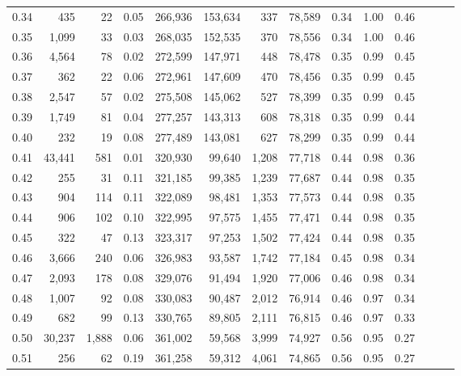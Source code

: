 \begin{tabular}{rrrrrrrrrrrrrr}
0.34 &     435 &      22 &  0.05 &  266,936 &  153,634 &     337 &  78,589 &  0.34 &  1.00 &      0.46 \\
0.35 &   1,099 &      33 &  0.03 &  268,035 &  152,535 &     370 &  78,556 &  0.34 &  1.00 &      0.46 \\
0.36 &   4,564 &      78 &  0.02 &  272,599 &  147,971 &     448 &  78,478 &  0.35 &  0.99 &      0.45 \\
0.37 &     362 &      22 &  0.06 &  272,961 &  147,609 &     470 &  78,456 &  0.35 &  0.99 &      0.45 \\
0.38 &   2,547 &      57 &  0.02 &  275,508 &  145,062 &     527 &  78,399 &  0.35 &  0.99 &      0.45 \\
0.39 &   1,749 &      81 &  0.04 &  277,257 &  143,313 &     608 &  78,318 &  0.35 &  0.99 &      0.44 \\
0.40 &     232 &      19 &  0.08 &  277,489 &  143,081 &     627 &  78,299 &  0.35 &  0.99 &      0.44 \\
0.41 &  43,441 &     581 &  0.01 &  320,930 &   99,640 &   1,208 &  77,718 &  0.44 &  0.98 &      0.36 \\
0.42 &     255 &      31 &  0.11 &  321,185 &   99,385 &   1,239 &  77,687 &  0.44 &  0.98 &      0.35 \\
0.43 &     904 &     114 &  0.11 &  322,089 &   98,481 &   1,353 &  77,573 &  0.44 &  0.98 &      0.35 \\
0.44 &     906 &     102 &  0.10 &  322,995 &   97,575 &   1,455 &  77,471 &  0.44 &  0.98 &      0.35 \\
0.45 &     322 &      47 &  0.13 &  323,317 &   97,253 &   1,502 &  77,424 &  0.44 &  0.98 &      0.35 \\
0.46 &   3,666 &     240 &  0.06 &  326,983 &   93,587 &   1,742 &  77,184 &  0.45 &  0.98 &      0.34 \\
0.47 &   2,093 &     178 &  0.08 &  329,076 &   91,494 &   1,920 &  77,006 &  0.46 &  0.98 &      0.34 \\
0.48 &   1,007 &      92 &  0.08 &  330,083 &   90,487 &   2,012 &  76,914 &  0.46 &  0.97 &      0.34 \\
0.49 &     682 &      99 &  0.13 &  330,765 &   89,805 &   2,111 &  76,815 &  0.46 &  0.97 &      0.33 \\
0.50 &  30,237 &   1,888 &  0.06 &  361,002 &   59,568 &   3,999 &  74,927 &  0.56 &  0.95 &      0.27 \\
0.51 &     256 &      62 &  0.19 &  361,258 &   59,312 &   4,061 &  74,865 &  0.56 &  0.95 &      0.27 \\

\end{tabular}
